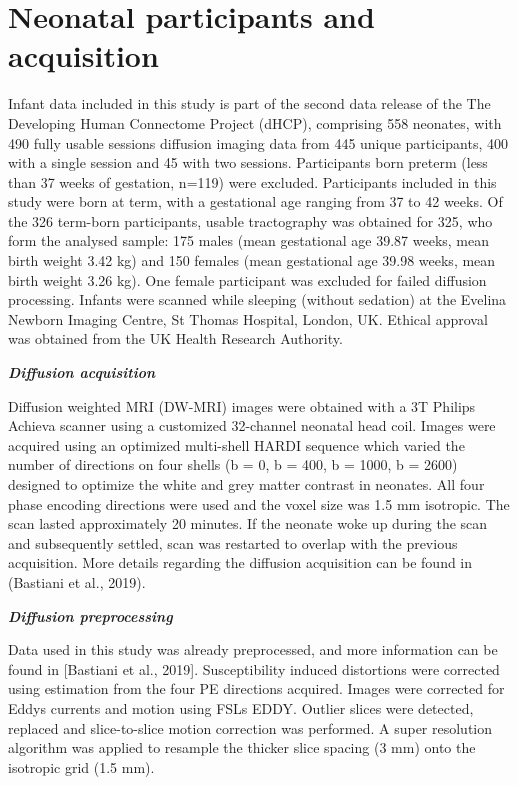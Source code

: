 \documentclass[11pt]{article}
\begin{document}
\section{Neonatal participants and acquisition}

Infant data included in this study is part of the second data release of
the The Developing Human Connectome Project (dHCP), comprising 558
neonates, with 490 fully usable sessions diffusion imaging data from 445
unique participants, 400 with a single session and 45 with two sessions.
Participants born preterm (less than 37 weeks of gestation, n=119) were
excluded. Participants included in this study were born at term, with a
gestational age ranging from 37 to 42 weeks. Of the 326 term-born
participants, usable tractography was obtained for 325, who form the
analysed sample: 175 males (mean gestational age 39.87 weeks, mean birth
weight 3.42 kg) and 150 females (mean gestational age 39.98 weeks, mean
birth weight 3.26 kg). One female participant was excluded for failed
diffusion processing. Infants were scanned while sleeping (without
sedation) at the Evelina Newborn Imaging Centre, St
Thomas\textquotesingle{} Hospital, London, UK. Ethical approval was
obtained from the UK Health Research Authority.

\textbf{\emph{Diffusion acquisition}}

Diffusion weighted MRI (DW-MRI) images were obtained with a 3T Philips
Achieva scanner using a customized 32-channel neonatal head coil. Images
were acquired using an optimized multi-shell HARDI sequence which varied
the number of directions on four shells (b = 0, b = 400, b = 1000, b =
2600) designed to optimize the white and grey matter contrast in
neonates. All four phase encoding directions were used and the voxel
size was 1.5 mm isotropic. The scan lasted approximately 20 minutes. If
the neonate woke up during the scan and subsequently settled, scan was
restarted to overlap with the previous acquisition. More details
regarding the diffusion acquisition can be found in (Bastiani et al.,
2019).

\textbf{\emph{Diffusion preprocessing}}

Data used in this study was already preprocessed, and more information
can be found in {[}Bastiani et al., 2019{]}. Susceptibility induced
distortions were corrected using estimation from the four PE directions
acquired. Images were corrected for Eddy\textquotesingle s currents and
motion using FSL\textquotesingle s EDDY. Outlier slices were detected,
replaced and slice-to-slice motion correction was performed. A super
resolution algorithm was applied to resample the thicker slice spacing
(3 mm) onto the isotropic grid (1.5 mm).
\end{document}
